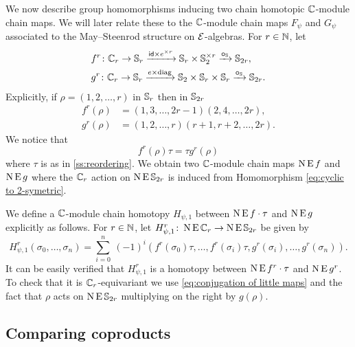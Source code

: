 We now describe group homomorphisms inducing two chain homotopic $\mathbb{C}$-module chain maps.
We will later relate these to the $\mathbb{C}$-module chain maps $F_\psi$ and $G_\psi$ associated to the May--Steenrod structure on $\mathcal{E}$-algebras.
For $r \in \mathbb{N}$, let
\[
\begin{split}
	&f^r \colon \mathbb{C}_r \to \mathbb{S}_r \xrightarrow{\mathsf{id} \times e^{\times r}} \mathbb{S}_r \times \mathbb{S}_2^{\times r} \xrightarrow{\bm{\circ}_{\mathbb{S}}} \mathbb{S}_{2r}, \\
	&g^r \colon \mathbb{C}_r \to \mathbb{S}_r \xrightarrow{e \times \mathrm{diag}} \mathbb{S}_2 \times \mathbb{S}_r \times \mathbb{S}_r \xrightarrow{\bm{\circ}_{\mathbb{S}}} \mathbb{S}_{2r}.
\end{split}
\]
Explicitly, if $\rho = (1,2,\dots,r)$ in $\mathbb{S}_r$ then in $\mathbb{S}_{2r}$
\begin{align*}
	f^r(\rho) &= (1,3,\dots,2r-1)(2,4,\dots,2r), \\
	g^r(\rho) &= (1,2,\dots,r)(r+1,r+2,\dots,2r).
\end{align*}
We notice that
\begin{equation}\label{eq:conjugation of little maps}
	f^r(\rho) \tau = \tau g^r(\rho)
\end{equation}
where $\tau$ is as in \cref{ss:reordering}.
We obtain two $\mathbb{C}$-module chain maps $\operatorname{N}\operatorname{E} f$ and $\operatorname{N}\operatorname{E} g$ where the $\mathbb{C}_r$ action on $\operatorname{N}\operatorname{E}\mathbb{S}_{2r}$ is induced from Homomorphism \eqref{eq:cyclic to 2-symetric}.

We define a $\mathbb{C}$-module chain homotopy $H_{\psi,1}$ between $\operatorname{N} \operatorname{E} f \cdot \tau$ and $\operatorname{N} \operatorname{E} g$
explicitly as follows.
For $r \in \mathbb{N}$, let $H_{\psi,1}^r \colon \operatorname{N}\operatorname{E}\mathbb{C}_r \to \operatorname{N}\operatorname{E}\mathbb{S}_{2r}$ be given by
\[
H_{\psi,1}^r(\sigma_0,\dots,\sigma_n) =
\sum_{i=0}^n \ (-1)^i (f^r(\sigma_0) \tau, \dots, f^r(\sigma_i) \tau, g^r(\sigma_i), \dots, g^r(\sigma_n)).
\]
It can be easily verified that $H_{\psi,1}^r$ is a homotopy between $\operatorname{N} \operatorname{E} f^r \cdot \tau$ and $\operatorname{N} \operatorname{E} g^r$.
To check that it is $\mathbb{C}_r$-equivariant we use \cref{eq:conjugation of little maps} and the fact that $\rho$ acts on $\operatorname{N}\operatorname{E}\mathbb{S}_{2r}$ multiplying on the right by $g(\rho)$.

\subsection{Comparing coproducts}

